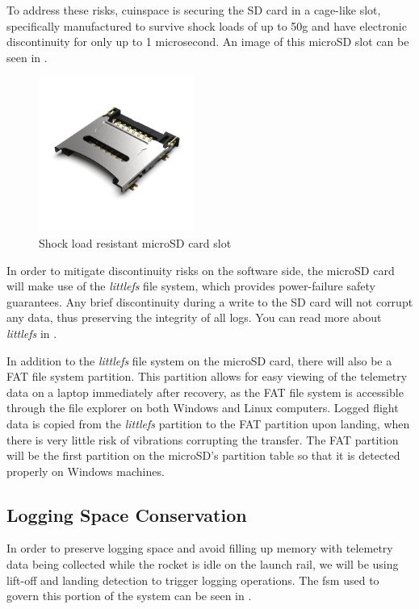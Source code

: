To address these risks, \gls{cuinspace} is securing the SD card in a cage-like slot, specifically manufactured to
survive shock loads of up to 50g and have electronic discontinuity for only up to 1 microsecond.
\cite{sd-cage-datasheet} An image of this microSD slot can be seen in .

\begin{figure}[H]
    \centering
    \includegraphics[width=2in]{./assets/images/sd-card-cage.png}
    \caption{Shock load resistant microSD card slot \cite{sd-card-cage}}
    \label{fig:sd-card-cage}
\end{figure}

In order to mitigate discontinuity risks on the software side, the microSD card will make use of the \textit{littlefs}
file system, which provides power-failure safety guarantees. Any brief discontinuity during a write to the SD card will
not corrupt any data, thus preserving the integrity of all logs. You can read more about \textit{littlefs} in
.

In addition to the \textit{littlefs} file system on the microSD card, there will also be a FAT file system partition.
This partition allows for easy viewing of the telemetry data on a laptop immediately after recovery, as the FAT file
system is accessible through the file explorer on both Windows and Linux computers. Logged flight data is copied from
the \textit{littlefs} partition to the FAT partition upon landing, when there is very little risk of vibrations
corrupting the transfer. The FAT partition will be the first partition on the microSD's partition table so that it is
detected properly on Windows machines.

\subsection{Logging Space Conservation}

In order to preserve logging space and avoid filling up memory with telemetry data being collected while the rocket is
idle on the launch rail, we will be using lift-off and landing detection to trigger logging operations. The \gls{fsm}
used to govern this portion of the system can be seen in .

